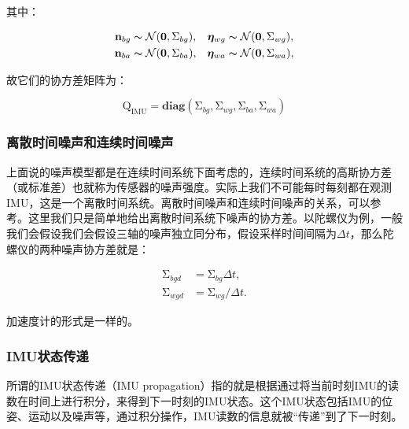 其中：

\begin{equation}
\begin{aligned}
    \mathbf{n}_{bg} & \thicksim \mathcal{N}(\mathbf{0}, \mathrm\Sigma_{bg}), &
    \bm\eta_{wg}    & \thicksim \mathcal{N}(\mathbf{0}, \mathrm\Sigma_{wg}), \\
    \mathbf{n}_{ba} & \thicksim \mathcal{N}(\mathbf{0}, \mathrm\Sigma_{ba}), &
    \bm\eta_{wa}    & \thicksim \mathcal{N}(\mathbf{0}, \mathrm\Sigma_{wa}),
\end{aligned}
\end{equation}

故它们的协方差矩阵为：

\begin{equation}
    \mathrm{Q}_{\textrm{IMU}} = \mathbf{diag}(
        \mathrm\Sigma_{bg},
        \mathrm\Sigma_{wg},
        \mathrm\Sigma_{ba},
        \mathrm\Sigma_{wa}
    )
\end{equation}

\subsubsection*{离散时间噪声和连续时间噪声}

上面说的噪声模型都是在连续时间系统下面考虑的，连续时间系统的高斯协方差（或标准差）也就称为传感器的噪声强度。实际上我们不可能每时每刻都在观测IMU，这是一个离散时间系统。离散时间噪声和连续时间噪声的关系，可以参考\citep{smith1978exact}。这里我们只是简单地给出离散时间系统下噪声的协方差。以陀螺仪为例，一般我们会假设我们会假设三轴的噪声独立同分布，假设采样时间间隔为$\Delta t$，那么陀螺仪的两种噪声协方差就是：

\begin{equation}
\begin{aligned}
    \mathrm\Sigma_{bgd} &= \mathrm\Sigma_{bg} \Delta t,  \\
    \mathrm\Sigma_{wgd} &= \mathrm\Sigma_{wg} / \Delta t.
\end{aligned}
\end{equation}

加速度计的形式是一样的。

\subsubsection*{IMU状态传递}

所谓的IMU状态传递（IMU propagation）指的就是根据通过将当前时刻IMU的读数在时间上进行积分，来得到下一时刻的IMU状态。这个IMU状态包括IMU的位姿、运动以及噪声等，通过积分操作，IMU读数的信息就被“传递”到了下一时刻。

